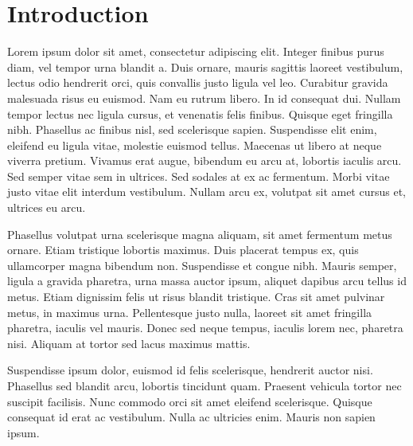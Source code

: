 \chapter{Introduction}
\label{chap:introduction}

\graphicspath{{chapters/1/img}}

Lorem ipsum dolor sit amet, consectetur adipiscing elit. Integer finibus purus diam, vel tempor urna blandit a. Duis ornare, mauris sagittis laoreet vestibulum, lectus odio hendrerit orci, quis convallis justo ligula vel leo. Curabitur gravida malesuada risus eu euismod. Nam eu rutrum libero. In id consequat dui. Nullam tempor lectus nec ligula cursus, et venenatis felis finibus. Quisque eget fringilla nibh. Phasellus ac finibus nisl, sed scelerisque sapien. Suspendisse elit enim, eleifend eu ligula vitae, molestie euismod tellus. Maecenas ut libero at neque viverra pretium. Vivamus erat augue, bibendum eu arcu at, lobortis iaculis arcu. Sed semper vitae sem in ultrices. Sed sodales at ex ac fermentum. Morbi vitae justo vitae elit interdum vestibulum. Nullam arcu ex, volutpat sit amet cursus et, ultrices eu arcu.

Phasellus volutpat urna scelerisque magna aliquam, sit amet fermentum metus ornare. Etiam tristique lobortis maximus. Duis placerat tempus ex, quis ullamcorper magna bibendum non. Suspendisse et congue nibh. Mauris semper, ligula a gravida pharetra, urna massa auctor ipsum, aliquet dapibus arcu tellus id metus. Etiam dignissim felis ut risus blandit tristique. Cras sit amet pulvinar metus, in maximus urna. Pellentesque justo nulla, laoreet sit amet fringilla pharetra, iaculis vel mauris. Donec sed neque tempus, iaculis lorem nec, pharetra nisi. Aliquam at tortor sed lacus maximus mattis.

Suspendisse ipsum dolor, euismod id felis scelerisque, hendrerit auctor nisi. Phasellus sed blandit arcu, lobortis tincidunt quam. Praesent vehicula tortor nec suscipit facilisis. Nunc commodo orci sit amet eleifend scelerisque. Quisque consequat id erat ac vestibulum. Nulla ac ultricies enim. Mauris non sapien ipsum.
